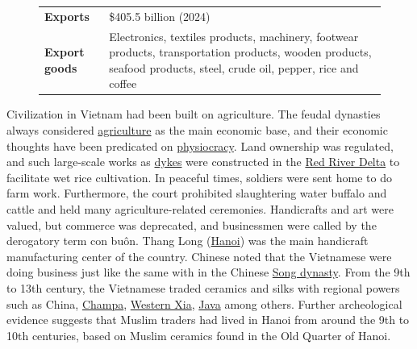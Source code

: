 \documentclass[openany]{book}
\begin{document}
\begin{figure}
\begin{tcolorbox}[toprule=0pt,bottomrule=0pt]
\begin{tabularx}{\linewidth}{@{}>{\raggedright\arraybackslash}p{2.6cm} >{\raggedright\arraybackslash}X@{}}
            \textbf{Exports}              & \$405.5 billion (2024)\cite{19}                                                                                                                                                                                                                         \\
            \textbf{Export goods}         & { Electronics, textiles products, machinery, footwear products, transportation products, wooden products, seafood products, steel, crude oil, pepper, rice and coffee}                                                                        \\
          \end{tabularx}
    \end{tcolorbox}
    \vspace{125pt}
\end{figure}
\begin{sloppypar}\RaggedRight
Civilization in Vietnam had been built on agriculture. The feudal dynasties always considered \href{https://en.wikipedia.org/wiki/Agriculture}{agriculture} as the main economic base, and their economic thoughts have been predicated on \href{https://en.wikipedia.org/wiki/Physiocracy}{physiocracy}. Land ownership was regulated, and such large-scale works as \href{https://en.wikipedia.org/wiki/Dike_(construction)}{dykes} were constructed in the \href{https://en.wikipedia.org/wiki/Red_River_Delta}{Red River Delta} to facilitate wet rice cultivation. In peaceful times, soldiers were sent home to do farm work. Furthermore, the court prohibited slaughtering water buffalo and cattle and held many agriculture-related ceremonies. Handicrafts and art were valued, but commerce was deprecated, and businessmen were called by the derogatory term con buôn. Thang Long (\href{https://en.wikipedia.org/wiki/Hanoi}{Hanoi}) was the main handicraft manufacturing center of the country. Chinese noted that the Vietnamese were doing business just like the same with in the Chinese \href{https://en.wikipedia.org/wiki/Song_dynasty}{Song dynasty}. From the 9th to 13th century, the Vietnamese traded ceramics and silks with regional powers such as China, \href{https://en.wikipedia.org/wiki/Champa}{Champa}, \href{https://en.wikipedia.org/wiki/Western_Xia}{Western Xia}, \href{https://en.wikipedia.org/wiki/Java}{Java} among others.\cite{29} Further archeological evidence suggests that Muslim traders had lived in Hanoi from around the 9th to 10th centuries, based on Muslim ceramics found in the Old Quarter of Hanoi.\cite{30}
\end{sloppypar}
\end{document}
